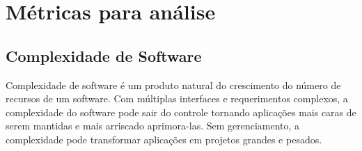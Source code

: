 %
%
%
%
%

\section{Métricas para análise} \label {sec:softwareMetrics}

\subsection{Complexidade de Software}
Complexidade de software é um produto natural do crescimento do número de recursos de um software. Com múltiplas interfaces e requerimentos complexos, a complexidade do software pode sair do controle tornando aplicações mais caras de serem mantidas e mais arriscado aprimora-las. Sem gerenciamento, a complexidade pode transformar aplicações em projetos grandes e pesados.

